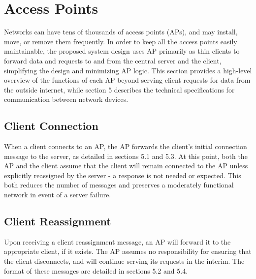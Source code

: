 \documentclass[10pt,journal,compsoc]{IEEEtran}
\begin{document}
		\section{Access Points}
		Networks can have tens of thousands of access points (APs), and may install, move, or remove them frequently. In order to keep all the access points easily maintainable, the proposed system design uses AP primarily as thin clients to forward data and requests to and from the central server and the client, simplifying the design and minimizing AP logic. This section provides a high-level overview of the functions of each AP beyond serving client requests for data from the outside internet, while section 5 describes the technical specifications for communication between network devices.
		
		\subsection{Client Connection}
		When a client connects to an AP, the AP forwards the client's initial connection message to the server, as detailed in sections 5.1 and 5.3. At this point, both the AP and the client assume that the client will remain connected to the AP unless explicitly reassigned by the server - a response is not needed or expected. This both reduces the number of messages and preserves a moderately functional network in event of a server failure.
		
		\subsection{Client Reassignment} Upon receiving a client reassignment message, an AP will forward it to the appropriate client, if it exists. The AP assumes no responsibility for ensuring that the client disconnects, and will continue serving its requests in the interim. The format of these messages are detailed in sections 5.2 and 5.4.
		
\end{document}
